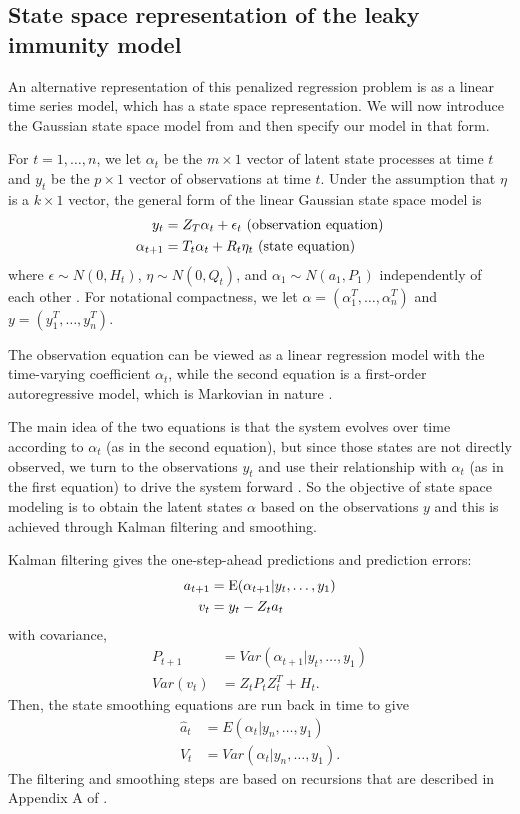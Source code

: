 \documentclass{article}
\begin{document}
\subsection{State space representation of the leaky immunity model}

An alternative representation of this penalized regression problem is as a linear time series model, which has a state space representation. We will now introduce the Gaussian state space model from \citet{helske2016kfas} and then specify our model in that form.

For $t = 1, \dots, n$, we let $\alpha_t$ be the $m \times 1$ vector of latent state processes at time $t$ and $y_t$ be the $p \times 1$ vector of observations at time $t$. Under the assumption that $\eta$ is a $k \times 1$ vector, the general form of the linear Gaussian state space model is 
\begin{align}
y_t &= Z_T\alpha_t + \epsilon_t  \text{     (observation equation)} \label{eq:ss1}\\
\alpha_{t+1} &= T_t\alpha_t + R_t\eta_t  \text{     (state equation) \label{eq:ss2}}
\end{align}
where $\epsilon \sim N(0, H_t)$, $\eta \sim N(0, Q_t)$, and $\alpha_1 \sim N(a_1, P_1)$ independently of each other \citep{helske2016kfas}. For notational compactness, we let $\alpha = \left ( \alpha_1^T, \dots, \alpha_n^T \right )$ and $y = \left ( y_1^T, \dots, y_n^T \right )$.

The observation equation can be viewed as a linear regression model with the time-varying coefficient $\alpha_t$, while the second equation is a first-order autoregressive model, which is Markovian in nature \citep{durbin2012time}. 

The main idea of the two equations is that the system evolves over time according to $\alpha_t$ (as in the second equation), but since those states are not directly observed, we turn to the observations $y_t$ and use their relationship with $\alpha_t$ (as in the first equation) to drive the system forward \citep{durbin2012time}. So the objective of state space modeling is to obtain the latent states $\alpha$ based on the observations $y$ and this is achieved through Kalman filtering and smoothing. 

Kalman filtering gives the one-step-ahead predictions and prediction errors:
\begin{align*}
a_{t+1} &= \textup{E}(\alpha_{t+1}|y_t, \dots, y_1) \\
v_t &= y_t - Z_ta_t
\end{align*} with covariance, 
\begin{align*}
P_{t+1} &= Var(\alpha_{t+1}|y_t, \dots, y_1) \\
Var(v_t) &= Z_tP_tZ_t^T + H_t.
\end{align*}
Then, the state smoothing equations are run back in time to give
\begin{align}
\hat{a}_t &= E(\alpha_{t}|y_n, \dots, y_1) \label{eq:hatat}\\
V_t &= Var(\alpha_{t}|y_n, \dots, y_1). \label{eq:Vt}
\end{align}
The filtering and smoothing steps are based on recursions that are described in Appendix A of \citep{helske2016kfas}. 
\end{document}
